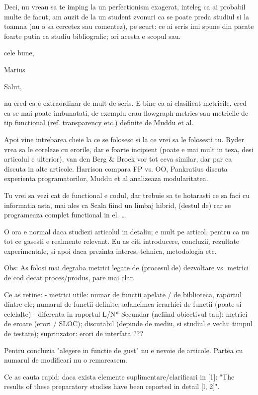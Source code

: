 \documentclass{article}
\begin{document}
Deci, nu vreau sa te imping la un perfectionism exagerat, inteleg ca
ai probabil multe de facut, am auzit de la un student zvonuri ca se
poate preda studiul si la toamna (nu o sa cercetez sau comentez),
pe scurt: ce ai scris imi spune din pacate foarte putin ca studiu
bibliografic; ori acesta e scopul sau.

cele bune,

Marius



Salut,

nu cred ca e extraordinar de mult de scris.
E bine ca ai clasificat metricile, cred ca se mai poate imbunatati,
de exemplu erau flowgraph metrics sau metricile de tip functional
(ref. transparency etc.) definite de Muddu et al.

Apoi vine intrebarea cheie la ce se folosesc si la ce vrei sa le
folosesti tu. Ryder vrea sa le coreleze cu erorile, dar e foarte
incipient (poate e mai mult in teza, desi articolul e ulterior).
van den Berg \& Broek vor tot ceva similar, dar par ca discuta in alte
articole. Harrison compara FP vs. OO, Pankratius discuta experienta
programatorilor, Muddu et al analizeaza modularitatea.

Tu vrei sa vezi cat de functional e codul, dar trebuie sa te hotarasti
ce sa faci cu informatia asta, mai ales ca Scala fiind un limbaj hibrid,
(destul de) rar se programeaza complet functional in el.
…




O ora e normal daca studiezi articolul in detaliu; e mult pe articol,
pentru ca nu tot ce gasesti e realmente relevant.
Eu as citi introducere, concluzii, rezultate experimentale, si apoi
daca prezinta interes, tehnica, metodologia etc.

Obs: As folosi mai degraba metrici legate de (procesul de) dezvoltare vs.
metrici de cod decat proces/produs, pare mai clar.

Ce as retine:
- metrici utile: numar de functii apelate / de biblioteca, raportul
dintre ele; numarul de functii definite; adancimea ierarhiei de functii
(poate si celelalte)
- diferenta in raportul L/N*
Secundar (nefiind obiectivul tau): metrici de eroare (erori / SLOC);
discutabil (depinde de mediu, si studiul e vechi: timpul de testare);
suprinzator: erori de interfata ???

Pentru concluzia "alegere in functie de gust" nu e nevoie de articole.
Partea cu numarul de modificari nu o remarcasem.

Ce as cauta rapid: daca exista elemente suplimentare/clarificari in [1]:
"The results of these preparatory studies have been reported in detail
[l, 2]".
\end{document}
